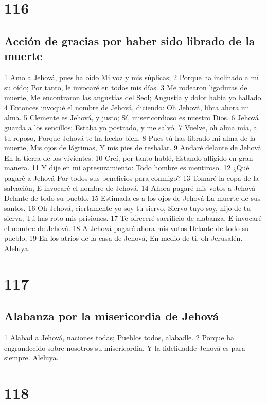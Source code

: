 \chapter{116}

\section*{Acción de gracias por haber sido librado de la muerte}

1 Amo a Jehová, pues ha oído
Mi voz y mis súplicas;
2 Porque ha inclinado a mí su oído;
Por tanto, le invocaré en todos mis días.
3 Me rodearon ligaduras de muerte,
Me encontraron las angustias del Seol;
Angustia y dolor había yo hallado.
4 Entonces invoqué el nombre de Jehová, diciendo:
Oh Jehová, libra ahora mi alma.
5 Clemente es Jehová, y justo;
Sí, misericordioso es nuestro Dios.
6 Jehová guarda a los sencillos;
Estaba yo postrado, y me salvó.
7 Vuelve, oh alma mía, a tu reposo,
Porque Jehová te ha hecho bien.
8 Pues tú has librado mi alma de la muerte,
Mis ojos de lágrimas,
Y mis pies de resbalar.
9 Andaré delante de Jehová
En la tierra de los vivientes.
10 Creí; por tanto hablé,
Estando afligido en gran manera.
11 Y dije en mi apresuramiento:
Todo hombre es mentiroso.
12 ¿Qué pagaré a Jehová
Por todos sus beneficios para conmigo?
13 Tomaré la copa de la salvación,
E invocaré el nombre de Jehová.
14 Ahora pagaré mis votos a Jehová
Delante de todo su pueblo.
15 Estimada es a los ojos de Jehová
La muerte de sus santos.
16 Oh Jehová, ciertamente yo soy tu siervo,
Siervo tuyo soy, hijo de tu sierva;
Tú has roto mis prisiones.
17 Te ofreceré sacrificio de alabanza,
E invocaré el nombre de Jehová.
18 A Jehová pagaré ahora mis votos
Delante de todo su pueblo,
19 En los atrios de la casa de Jehová,
En medio de ti, oh Jerusalén.
Aleluya.

\chapter{117}

\section*{Alabanza por la misericordia de Jehová}

1 Alabad a Jehová, naciones todas;
Pueblos todos, alabadle.
2 Porque ha engrandecido sobre nosotros su misericordia,
Y la fidelidadde Jehová es para siempre.
Aleluya.

\chapter{118}

